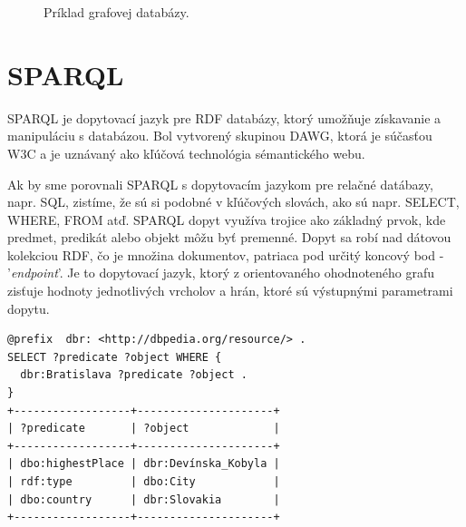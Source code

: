 \documentclass[12pt, a4paper, oneside]{book}
\begin{document}
\begin{figure}[h]
\label{fig:semantic_web}
\caption{Príklad grafovej databázy.}
\end{figure}

\section{SPARQL}
SPARQL \cite{sparql} je dopytovací jazyk pre RDF databázy, ktorý umožňuje získavanie a manipuláciu s databázou. Bol vytvorený skupinou DAWG, ktorá je súčasťou W3C a je uznávaný ako kľúčová technológia sémantického webu. 


\quad Ak by sme porovnali SPARQL s dopytovacím jazykom pre relačné datábazy, napr. SQL, zistíme, že sú si podobné v kľúčových slovách, ako sú napr. SELECT, WHERE, FROM atď. SPARQL dopyt využíva trojice ako základný prvok, kde predmet, predikát alebo objekt môžu byť premenné. Dopyt sa robí nad dátovou kolekciou RDF, čo je množina dokumentov, patriaca pod určitý koncový bod - '\textit{endpoint}'. Je to dopytovací jazyk, ktorý z orientovaného ohodnoteného grafu zisťuje hodnoty jednotlivých vrcholov a hrán, ktoré sú výstupnými parametrami dopytu.

\begin{verbatim}
@prefix	 dbr: <http://dbpedia.org/resource/> .
SELECT ?predicate ?object WHERE {
  dbr:Bratislava ?predicate ?object .
}
+------------------+---------------------+
| ?predicate       | ?object             | 
+------------------+---------------------+
| dbo:highestPlace | dbr:Devínska_Kobyla | 
| rdf:type         | dbo:City            | 
| dbo:country      | dbr:Slovakia        | 
+------------------+---------------------+
\end{verbatim}
\end{document}
